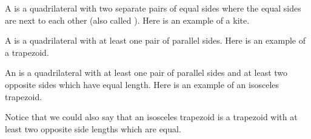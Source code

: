 \documentclass{ximera}
\begin{document}
\begin{definition}
	A  is a quadrilateral with two separate pairs of equal sides where the equal sides are next to each other (also called ). Here is an example of a kite.
	\begin{center}
	\end{center}
\end{definition}


\begin{definition}
	A  is a quadrilateral with at least one pair of parallel sides. Here is an example of a trapezoid.
	\begin{center}
	\end{center}
\end{definition}


\begin{definition}
	An  is a quadrilateral with at least one pair of parallel sides and at least two opposite sides which have equal length. Here is an example of an isosceles trapezoid.
	\begin{center}
	\end{center}
\end{definition}
Notice that we could also say that an isosceles trapezoid is a trapezoid with at least two opposite side lengths which are equal.
\end{document}

